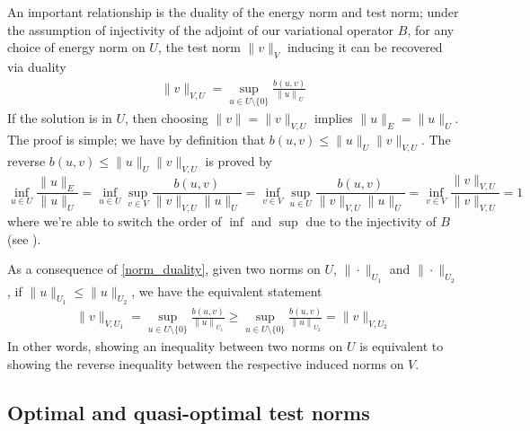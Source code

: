 \documentclass[11pt,onecolumn]{scrartcl}
\begin{document}
An important relationship is the duality of the energy norm and test norm; under the assumption of injectivity of the adjoint of our variational 	operator $B$, for any choice of energy norm on $U$, the test norm $\|v\|_V$ inducing it can be recovered via duality
\begin{align}
\| v \|_{V,U} = \sup_{u \in U\setminus \{0\}} \frac{b\left(u,v\right)}{\left\| u \right\|_U} \label{norm_duality}
\end{align}
If the solution is in $U$, then choosing $\|v\|=\|v\|_{V,U}$ implies $\|u\|_E = \|u\|_U$. The proof is simple; we have by definition that $b(u,v) \leq \|u\|_U\|v\|_{V,U}$. The reverse $b(u,v) \leq \|u\|_U\|v\|_{V,U}$ is proved by
\[
\inf_{u\in U} \frac{\|u\|_E}{\|u\|_U} = \inf_{u\in U} \sup_{v\in V}\frac{b(u,v)}{\|v\|_{V,U}\|u\|_U} = \inf_{v\in V} \sup_{u\in U}\frac{b(u,v)}{\|v\|_{V,U}\|u\|_U} = \inf_{v\in V} \frac{\|v\|_{V,U}}{\|v\|_{V,U}} = 1
\]
where we're able to switch the order of $\inf$ and $\sup$ due to the injectivity of $B$ (see  \cite{BabuskaEquivBrezzi}). 

As a consequence of \eqref{norm_duality}, given two norms on $U$, $\|\cdot\|_{U_1}$ and $\|\cdot\|_{U_2}$, if $\|u\|_{U_1} \leq \|u\|_{U_2}$, we have the equivalent statement
\begin{align*}
\| v \|_{V,U_1} = \sup_{u \in U\setminus \{0\}} \frac{b\left(u,v\right)}{\left\| u \right\|_{U_1}} \geq  \sup_{u \in U\setminus \{0\}} \frac{b\left(u,v\right)}{\left\| u \right\|_{U_2}} = \| v \|_{V,U_2} 
\end{align*}
In other words, showing an inequality between two norms on $U$ is equivalent to showing the reverse inequality between the respective induced norms on $V$.  

\subsection{Optimal and quasi-optimal test norms}
\end{document}
